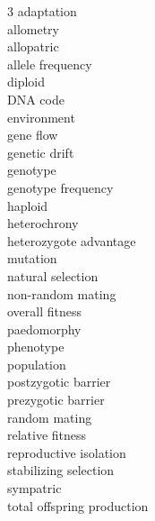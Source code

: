
\begin{multicols}{3}
adaptation\\
allometry \\
allopatric \\
allele frequency\\
diploid\\
DNA code\\
environment\\
gene flow\\
genetic drift\\
genotype\\
genotype frequency\\
haploid\\
heterochrony \\
heterozygote advantage\\
mutation\\
natural selection\\
non-random mating\\
overall fitness\\
paedomorphy \\
phenotype\\
population\\
postzygotic barrier\\
prezygotic barrier\\
random mating\\
relative fitness\\
reproductive isolation\\
stabilizing selection\\
sympatric\\
total offspring production
\end{multicols}
